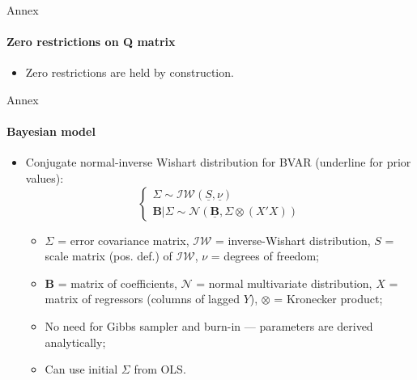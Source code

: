 \documentclass{beamer}
\begin{document}
\begin{frame}[noframenumbering]{Annex}
	\framesubtitle{Zero restrictions on Q matrix}
	\label{zero_q}
	\begin{algorithm}[H]
	\end{algorithm}
	\begin{itemize}
		\item Zero restrictions are held by construction.
	\end{itemize}
\end{frame}

\begin{frame}[noframenumbering]{Annex}
	\framesubtitle{Bayesian model}
	\label{bvar}
	\begin{itemize}
		\item Conjugate normal-inverse Wishart distribution for BVAR (underline for prior values):
		\begin{equation}
			\begin{cases}
					\Sigma \sim \mathcal{IW}(\underline{S}, \underline{\nu})\\
					\mathbf{B} | \Sigma  \sim \mathcal{N} (\underline{\mathbf{B}}, \Sigma \otimes (X'X))
				\end{cases}
		\end{equation}
		\begin{itemize}
			\item $\Sigma$ = error covariance matrix, $\mathcal{IW}$ = inverse-Wishart distribution, $S$ = scale matrix (pos. def.) of $\mathcal{IW}$, $\nu$ = degrees of freedom;
			\item $\mathbf{B}$ = matrix of coefficients, $\mathcal{N}$ = normal multivariate distribution, $X$ = matrix of regressors (columns of lagged $Y$), $\otimes$ = Kronecker product;
			\item No need for Gibbs sampler and burn-in --- parameters are derived analytically;
			\item Can use initial $\Sigma$ from OLS.
		\end{itemize}
	\end{itemize}
\end{frame}
\end{document}
